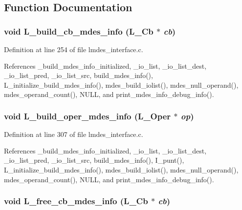 \subsection{Function Documentation}
\subsubsection{\setlength{\rightskip}{0pt plus 5cm}void L\_\-build\_\-cb\_\-mdes\_\-info (L\_\-Cb $\ast$ {\em cb})}\label{lmdes__interface_8c_2d2835ec3cbec05456f9a6c34bf5eb92}




Definition at line 254 of file lmdes\_\-interface.c.

References \_\-build\_\-mdes\_\-info\_\-initialized, \_\-io\_\-list, \_\-io\_\-list\_\-dest, \_\-io\_\-list\_\-pred, \_\-io\_\-list\_\-src, build\_\-mdes\_\-info(), L\_\-initialize\_\-build\_\-mdes\_\-info(), mdes\_\-build\_\-iolist(), mdes\_\-null\_\-operand(), mdes\_\-operand\_\-count(), NULL, and print\_\-mdes\_\-info\_\-debug\_\-info().
\subsubsection{\setlength{\rightskip}{0pt plus 5cm}void L\_\-build\_\-oper\_\-mdes\_\-info (L\_\-Oper $\ast$ {\em op})}\label{lmdes__interface_8c_63a7bbae5be233d1ecd8e767e686f6b5}




Definition at line 307 of file lmdes\_\-interface.c.

References \_\-build\_\-mdes\_\-info\_\-initialized, \_\-io\_\-list, \_\-io\_\-list\_\-dest, \_\-io\_\-list\_\-pred, \_\-io\_\-list\_\-src, build\_\-mdes\_\-info(), I\_\-punt(), L\_\-initialize\_\-build\_\-mdes\_\-info(), mdes\_\-build\_\-iolist(), mdes\_\-null\_\-operand(), mdes\_\-operand\_\-count(), NULL, and print\_\-mdes\_\-info\_\-debug\_\-info().
\subsubsection{\setlength{\rightskip}{0pt plus 5cm}void L\_\-free\_\-cb\_\-mdes\_\-info (L\_\-Cb $\ast$ {\em cb})}\label{lmdes__interface_8c_78e2d3c1739cb67e8a13e5bdf9130233}




